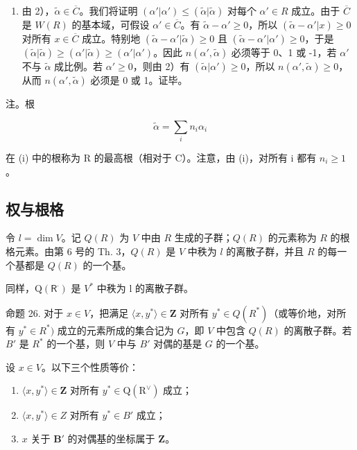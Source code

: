 \begin{enumerate}
\def\labelenumi{\arabic{enumi})}
\setcounter{enumi}{4}
\tightlist
\item
  由 2），\(\tilde{\alpha} \in \overline{C}\)。我们将证明 \((\alpha'|\alpha') \leqslant (\tilde{\alpha}|\tilde{\alpha})\) 对每个 \(\alpha' \in R\) 成立。由于 \(\overline{C}\) 是 \(W(R)\) 的基本域，可假设 \(\alpha' \in \overline{C}\)。有 \(\tilde{\alpha} - \alpha' \geqslant 0\)，所以 \((\tilde{\alpha} - \alpha' | x) \geqslant 0\) 对所有 \(x \in \overline{C}\) 成立。特别地 \((\tilde{\alpha} - \alpha' |\tilde{\alpha}) \geqslant 0\) 且 \((\tilde{\alpha} - \alpha' |\alpha') \geqslant 0\)，于是 \((\tilde{\alpha}|\tilde{\alpha}) \geqslant (\alpha'|\tilde{\alpha}) \geqslant (\alpha'|\alpha')\)。因此 \(n(\alpha',\tilde{\alpha})\) 必须等于 0、1 或 -1，若 \(\alpha'\) 不与 \(\tilde{\alpha}\) 成比例。若 \(\alpha' \geqslant 0\)，则由 2）有 \((\tilde{\alpha}|\alpha') \geqslant 0\)，所以 \(n(\alpha',\tilde{\alpha}) \geqslant 0\)，从而 \(n(\alpha',\tilde{\alpha})\) 必须是 0 或 1。证毕。
\end{enumerate}

注。根

\[
\tilde {\alpha} = \sum_ {i} n _ {i} \alpha_ {i}
\]

在 (i) 中的根称为 R 的最高根（相对于 C）。注意，由 (i)，对所有 i 都有 \(n_{i} \geqslant 1\)。

\subsection{权与根格}

令 \(l = \dim V\)。记 \(Q(R)\) 为 \(V\) 中由 \(R\) 生成的子群；\(Q(R)\) 的元素称为 \(R\) 的根格元素。由第 6 号的 Th. 3，\(Q(R)\) 是 \(V\) 中秩为 \(l\) 的离散子群，并且 \(R\) 的每一个基都是 \(Q(R)\) 的一个基。

同样，\(\mathrm{Q}(\mathsf{R}^{\cdot})\) 是 \(V^{*}\) 中秩为 l 的离散子群。

 命题 26. 对于 \(x \in V\)，把满足 \(\langle x, y^* \rangle \in \mathbf{Z}\) 对所有 \(y^* \in Q(R^*)\)（或等价地，对所有 \(y^* \in R^*)\) 成立的元素所成的集合记为 \(G\)，即 \(V\) 中包含 \(Q(R)\) 的离散子群。若 \(B'\) 是 \(R^*\) 的一个基，则 \(V\) 中与 \(B'\) 对偶的基是 \(G\) 的一个基。

设 \(x \in V\)。以下三个性质等价：

\begin{enumerate}
\def\labelenumi{(\roman{enumi})}
\item
  \(\langle x, y^{*} \rangle \in \mathbf{Z}\) 对所有 \(y^{*} \in \mathrm{Q}(\mathrm{R}^{\vee})\) 成立；
\item
  \(\langle x, y^{*} \rangle \in Z\) 对所有 \(y^{*} \in B'\) 成立；
\item
  \(x\) 关于 \(\mathbf{B}'\) 的对偶基的坐标属于 \(\mathbf{Z}\)。
\end{enumerate}

